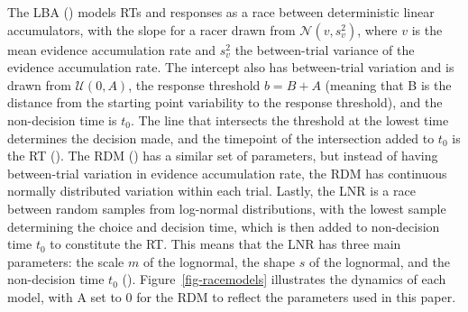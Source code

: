 \documentclass[
  stu,
  floatsintext,
  longtable,
  nolmodern,
  notxfonts,
  notimes,
  draftfirst,
  colorlinks=true,linkcolor=blue,citecolor=blue,urlcolor=blue]{apa7}
\begin{document}
The LBA () models RTs and
responses as a race between deterministic linear accumulators, with the
slope for a racer drawn from \(\mathcal{N}(v, s_{v}^2)\), where \(v\) is
the mean evidence accumulation rate and \(s_v^2\) the between-trial
variance of the evidence accumulation rate. The intercept also has
between-trial variation and is drawn from \(\mathcal{U}(0,A)\), the
response threshold \(b = B + A\) (meaning that B is the distance from
the starting point variability to the response threshold), and the
non-decision time is \(t_0\). The line that intersects the threshold at
the lowest time determines the decision made, and the timepoint of the
intersection added to \(t_0\) is the RT (). The RDM ()
has a similar set of parameters, but instead of having between-trial
variation in evidence accumulation rate, the RDM has continuous normally
distributed variation within each trial. Lastly, the LNR is a race
between random samples from log-normal distributions, with the lowest
sample determining the choice and decision time, which is then added to
non-decision time \(t_0\) to constitute the RT. This means that the LNR
has three main parameters: the scale \(m\) of the lognormal, the shape
\(s\) of the lognormal, and the non-decision time \(t_0\)
().
Figure~\ref{fig-racemodels} illustrates the dynamics of each model, with
A set to 0 for the RDM to reflect the parameters used in this paper.
\end{document}
